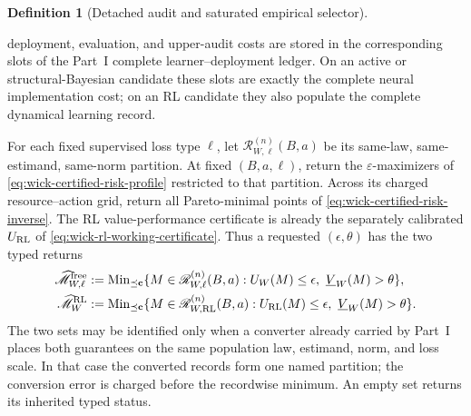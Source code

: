 \documentclass[11pt]{article}
\numberwithin{section}{part}
\theoremstyle{plain}
\theoremstyle{definition}
\newtheorem{definition}[definition]{Definition}
\theoremstyle{remark}
\begin{document}
\begin{definition}[Detached audit and saturated empirical selector]
\begin{enumerate}[label=\textup{(A\arabic*)}]
      deployment, evaluation, and upper-audit costs are stored in the
      corresponding slots of the Part~I complete learner--deployment ledger.
      On an active or structural-Bayesian candidate these slots are exactly
      the complete neural implementation cost; on an RL candidate they also
      populate the complete dynamical learning record.
\end{enumerate}
For each fixed supervised loss type \(\ell\), let
\(\mathscr R_{W,\ell}^{(n)}(B,a)\) be its same-law, same-estimand, same-norm
partition.  At fixed \((B,a,\ell)\), return the \(\varepsilon\)-maximizers
of \eqref{eq:wick-certified-risk-profile} restricted to that partition.
Across its charged resource--action grid, return all Pareto-minimal points of
\eqref{eq:wick-certified-risk-inverse}.  The RL value-performance certificate
is already the separately calibrated \(U_{\rm RL}\) of
\eqref{eq:wick-rl-working-certificate}.  Thus a requested
\((\epsilon,\theta)\) has the two typed returns
\begin{subequations}
 \label{eq:wick-empirical-pareto-return}
 \begin{align}
 \widehat{\mathscr M}_{W,\ell}^{\rm free}
 &:={\operatorname{Min}}_{\preceq\mathbf c}
 \{M\in\mathscr R_{W,\ell}^{(n)}(B,a):
       U_W(M)\le\epsilon,\ \underline V_W(M)>\theta\},
 \label{eq:wick-empirical-pareto-return-free}\\
 \widehat{\mathscr M}_{W}^{\rm RL}
 &:={\operatorname{Min}}_{\preceq\mathbf c}
 \{M\in\mathscr R_{W,\rm RL}^{(n)}(B,a):
       U_{\rm RL}(M)\le\epsilon,\ \underline V_W(M)>\theta\}.
 \label{eq:wick-empirical-pareto-return-rl}
 \end{align}
\end{subequations}
The two sets may be identified only when a converter already carried by
Part~I places both guarantees on the same population law, estimand, norm, and
loss scale.  In that case the converted records form one named partition;
the conversion error is charged before the recordwise minimum.
An empty set returns its inherited typed status.
\end{definition}
\end{document}

